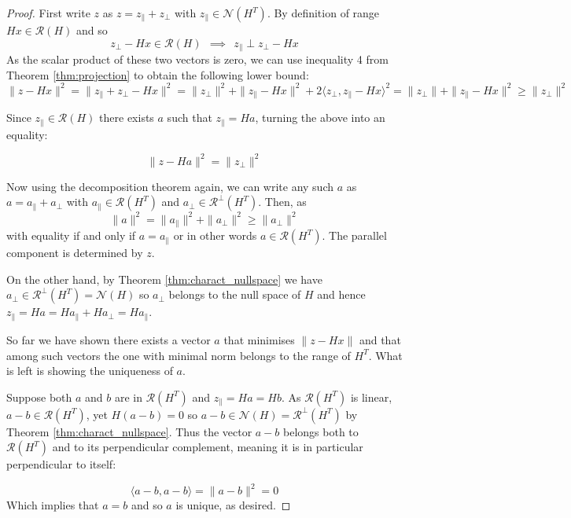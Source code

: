 \documentclass[a4paper]{article}
\theoremstyle{break}
\newcommand{\Nu}{\mathcal{N}}
\newcommand{\Ra}{\mathcal{R}}
\newcommand{\pll}{\parallel}
\begin{document}
\begin{proof} %
    First write $z$ as $z = z_\pll + z_\perp$ with $z_\pll \in \Nu(H^T)$.
    By definition of range $H x \in \Ra(H)$ and so
    $$ z_\perp - H x \in \Ra(H) ~~ \implies ~~ z_\pll \perp z_\perp - H x $$
    As the scalar product of these two vectors is zero, we can use inequality 4 from Theorem \ref{thm:projection} to obtain the following lower bound:
    \begin{equation}\label{eq:upper_bound}
    \| z - H x \|^2 = \| z_\pll + z_\perp - H x \|^2 =
    \| z_\perp \|^2 + \| z_\pll - H x \|^2 + 2 \langle z_\perp, z_\pll - H x \rangle^2 = 
    \| z_\perp \| + \| z_\pll - H x \|^2 \geq \| z_\perp \|^2        
    \end{equation}
    
    Since $ z_\pll \in \Ra(H)$ there exists $a$ such that $z_\pll = Ha$, turning the above into an equality:
    
    $$ \| z - Ha \|^2 = \| z_\perp \|^2$$
    
    Now using the decomposition theorem again, we can write any such $a$ as
    $ a = a_\pll + a_\perp $ with $a_\pll \in \Ra(H^T)$
    and $ a_\perp \in \Ra^\perp(H^T)$. Then, as 
    $$ \| a \|^2 = \| a_\pll \|^2 + \| a_\perp \|^2 \geq \| a_\perp\|^2$$
    with equality if and only if $a = a_\pll$ or in other words $ a \in \Ra(H^T)$. The parallel component is determined by $z$.

    On the other hand, by Theorem \ref{thm:charact_nullspace} we have $a_\perp \in \Ra^\perp (H^T) = \Nu(H)$ so $a_\perp$ belongs to the null space of $H$ and hence $ z_\pll = Ha = H a_\pll + H a_\perp = H a_\pll $.
    
    So far we have shown there exists a vector $a$ that minimises $ \| z - H x \| $ and that among such vectors the one with minimal norm belongs to the range of $ H^T $. What is left is showing the uniqueness of $a$.
    
    Suppose both $a$ and $b$ are in $ \Ra(H^T) $ and $ z_\pll = H a = H b$.
    As $ \Ra(H^T) $ is linear, $ a - b \in \Ra(H^T)$, yet $ H(a - b) = 0$ so $ a - b \in \Nu(H) = \Ra^\perp(H^T)$ by Theorem \ref{thm:charact_nullspace}. Thus the vector $ a - b$ belongs both to $ \Ra(H^T)$ and to its perpendicular complement, meaning it is in particular perpendicular to itself:
    
    $$ \langle a - b , a - b \rangle = \| a - b \|^2 = 0$$
    Which implies that $ a = b$ and so $a$ is unique, as desired.
\end{proof}
\end{document}
